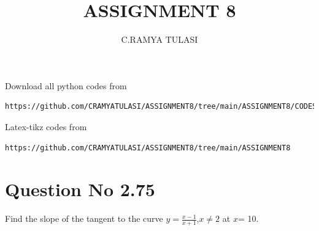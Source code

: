 \documentclass[journal,12pt,twocolumn]{IEEEtran}
\begin{document}
     \def\rightbox#1{\makebox[0in][r]{#1}}
     \def\centbox#1{\makebox[0in]{#1}}
     \def\topbox#1{\raisebox{-\baselineskip}[0in][0in]{#1}}
     \def\midbox#1{\raisebox{-0.5\baselineskip}[0in][0in]{#1}}
\vspace{3cm}
\title{ASSIGNMENT 8}
\author{C.RAMYA TULASI}
\maketitle
\newpage
\bigskip
\renewcommand{\thefigure}{\theenumi}
\renewcommand{\thetable}{\theenumi}
Download all python codes from 
\begin{lstlisting}
https://github.com/CRAMYATULASI/ASSIGNMENT8/tree/main/ASSIGNMENT8/CODES
\end{lstlisting}
%
Latex-tikz codes from 
%
\begin{lstlisting}
https://github.com/CRAMYATULASI/ASSIGNMENT8/tree/main/ASSIGNMENT8
\end{lstlisting}
%
\section{Question No 2.75}
Find the slope of the tangent to the curve  
$y=\frac{x-1}{x+1}$,$x \ne 2$ at $x$= 10.
\end{document}
